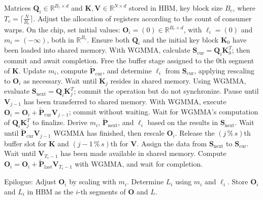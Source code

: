 \begin{algorithm}[H]
    \caption{\small\label{alg:flash3_wgmma}\textsc{FlashAttention-3} consumer warpgroup forward pass}
    \begin{algorithmic}[1]
      \REQUIRE  Matrices $\mathbf{Q}_i \in \mathbb{R}^{B_r \times d}$ and $\mathbf{K}, \mathbf{V} \in \mathbb{R}^{N \times d}$ stored in HBM, key block size $B_c$, where $T_c = \lceil \frac{N}{B_c} \rceil$.
      \STATE Adjust the allocation of registers according to the count of consumer warps.
      \STATE On the chip, set initial values: $\mathbf{O}_i = (0) \in \mathbb{R}^{B_r \times d}$, with $\ell_i = (0)$ and $m_i = (-\infty)$, both in $\mathbb{R}^{B_r}$.
      \STATE Ensure both $\mathbf{Q}_i$ and the initial key block $\mathbf{K}_0$ have been loaded into shared memory.
      \STATE With WGMMA, calculate $\mathbf{S}_{\mathrm{cur}} = \mathbf{Q}_i \mathbf{K}_0^T$; then commit and await completion.
      \STATE Free the buffer stage assigned to the $0$th segment of $\mathbf{K}$.
      \STATE Update $m_{i}$, compute $\tilde{\mathbf{P}}_{\mathrm{cur}}$, and determine $\ell_{i}$ from $\mathbf{S}_{\mathrm{cur}}$, applying rescaling to $\mathbf{O}_i$ as necessary.
        \STATE Wait until $\mathbf{K}_j$ resides in shared memory.
        \label{code:mainloop_start}
        \STATE Using WGMMA, evaluate $\mathbf{S}_{\mathrm{next}} = \mathbf{Q}_i \mathbf{K}_{j}^T$; commit the operation but do not synchronize.
        \label{code:first_wgmma}
        \STATE Pause until $\mathbf{V}_{j-1}$ has been transferred to shared memory.
        \STATE With WGMMA, execute $\mathbf{O}_{i} = \mathbf{O}_{i} + \tilde{\mathbf{P}}_{\mathrm{cur}} \mathbf{V}_{j-1}$; commit without waiting.
        \label{code:second_wgmma}
        \STATE Wait for WGMMA's computation of $\mathbf{Q}_i \mathbf{K}_{j}^T$ to finalize.
        \STATE Derive $m_{i}$, $\tilde{\mathbf{P}}_{\mathrm{next}}$, and $\ell_{i}$ based on the results in $\mathbf{S}_{\mathrm{next}}$.
        \label{code:softmax}
        \STATE Wait until $\tilde{\mathbf{P}}_{\mathrm{cur}} \mathbf{V}_{j-1}$ WGMMA has finished, then rescale $\mathbf{O}_i$.
        \STATE Release the $(j\,\%\,s)$th buffer slot for $\mathbf{K}$ and $(j-1\,\%\,s)$th for $\mathbf{V}$.
        \STATE Assign the data from $\mathbf{S}_{\mathrm{next}}$ to $\mathbf{S}_{\mathrm{cur}}$.
        \label{code:mainloop_end}
      \ENDFOR 
      \STATE Wait until $\mathbf{V}_{T_c - 1}$ has been made available in shared memory.
      \STATE Compute $\mathbf{O}_{i} = \mathbf{O}_{i} + \tilde{\mathbf{P}}_{\mathrm{last}} \mathbf{V}_{T_c - 1}$ with WGMMA, and wait for completion.

\STATE Epilogue: Adjust $\mathbf{O}_{i}$ by scaling with $m_{i}$. Determine $L_{i}$ using $m_{i}$ and $\ell_{i}$.  
      Store $\mathbf{O}_{i}$ and $L_{i}$ in HBM as the $i$-th segments of $\mathbf{O}$ and $L$.  
    \end{algorithmic}
  \end{algorithm}

